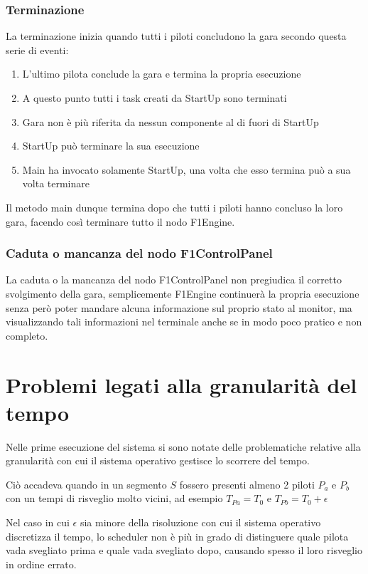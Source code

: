 \documentclass[a4paper,11pt, twoside, openright]{book}
\begin{document}
	\subsubsection{Terminazione}
	  La terminazione inizia quando tutti i piloti concludono la gara secondo questa serie di eventi:
	  
	  \begin{enumerate}
	    \item L'ultimo pilota conclude la gara e termina la propria esecuzione
	    \item A questo punto tutti i task creati da StartUp sono terminati
	    \item Gara non è più riferita da nessun componente al di fuori di StartUp
	    \item StartUp può terminare la sua esecuzione
	    \item Main ha invocato solamente StartUp, una volta che esso termina può a sua volta terminare
	  \end{enumerate}
	  
	  Il metodo main dunque termina dopo che tutti i piloti hanno concluso la loro gara, facendo così
	  terminare tutto il nodo F1Engine.
	  
	\subsubsection{Caduta o mancanza del nodo F1ControlPanel}
	  La caduta o la mancanza del nodo F1ControlPanel non pregiudica il corretto svolgimento della gara,
	  semplicemente F1Engine continuerà la propria esecuzione senza però poter mandare alcuna informazione
	  sul proprio stato al monitor, ma visualizzando tali informazioni nel terminale anche se in modo 
	  poco pratico e non completo.
    
    \section{Problemi legati alla granularità del tempo}
    \label{Problemi legati alla granularita del tempo}
      Nelle prime esecuzione del sistema si sono notate delle problematiche relative alla granularità con cui
      il sistema operativo gestisce lo scorrere del tempo.
      
      Ciò accadeva quando in un segmento $S$ fossero presenti almeno 2 piloti $P_a$ e $P_b$ con un tempi di risveglio
      molto vicini, ad esempio $T_{Pa} = T_0$ e $T_{Pb} = T_0 + \epsilon$
      
      Nel caso in cui $\epsilon$ sia minore della risoluzione con cui il sistema operativo discretizza il tempo,
      lo scheduler non è più in grado di distinguere quale pilota vada svegliato prima e quale vada svegliato dopo,
      causando spesso il loro risveglio in ordine errato.
      
\end{document}
